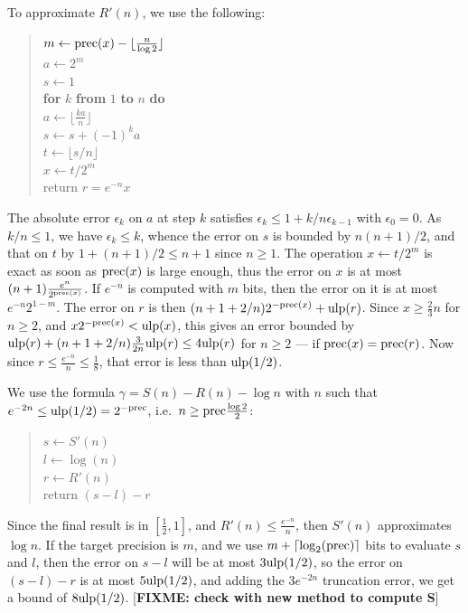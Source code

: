 \documentclass[12pt]{amsart}
\def\q{\hspace*{5mm}}
\def\ulp{{\rm ulp}}
\def\Paragraph#1{\noindent {\sc #1}}
\begin{document}
To approximate $R'(n)$, we use the following:
\begin{quote}
$m \leftarrow {\rm prec}(x) - \lfloor \frac{n}{\log 2} \rfloor$ \\
$a \leftarrow 2^m$ \\
$s \leftarrow 1$ \\
{\bf for} $k$ {\bf from} $1$ {\bf to} $n$ {\bf do} \\
\q $a \leftarrow \lfloor \frac{k a}{n} \rfloor$ \\
\q $s \leftarrow s + (-1)^{k} a$ \\
$t \leftarrow \lfloor s/n \rfloor$ \\
$x \leftarrow t/2^m$ \\
return $r = e^{-n} x$
\end{quote}
The absolute error $\epsilon_k$ on $a$ at step $k$ satisfies
$\epsilon_k \le 1 + k/n \epsilon_{k-1}$ with $\epsilon_0=0$.
As $k/n \le 1$, we have $\epsilon_k \le k$, whence the error
on $s$ is bounded by $n(n+1)/2$, and that on $t$ by
$1 + (n+1)/2 \le n+1$ since $n \ge 1$.
The operation $x \leftarrow t/2^m$ is exact as soon as ${\rm prec}(x)$ is large
enough, thus the error on $x$ is at most $(n+1) \frac{e^n}{2^{{\rm prec}(x)}}$.
If $e^{-n}$ is computed with $m$ bits, then
the error on it is at most $e^{-n} 2^{1-m}$.
The error on $r$ is then $(n + 1 + 2/n) 2^{-{\rm prec}(x)} +
\ulp(r)$.
Since $x \ge \frac{2}{3} n$ for $n \ge 2$, and $x 2^{-{\rm prec}(x)}
< \ulp(x)$, this gives an error bounded by
$\ulp(r) + (n + 1 + 2/n) \frac{3}{2n} \ulp(r)
\le 4 \ulp(r)$ for $n \ge 2$ --- if ${\rm prec}(x) = {\rm prec}(r)$.
Now since $r \le \frac{e^{-n}}{n} \le \frac{1}{8}$, that error
is less than $\ulp(1/2)$.

\medskip

\Paragraph{Final computation.} We use the formula
$\gamma = S(n) - R(n) - \log n$ with $n$ such that $e^{-2n} \le
\ulp(1/2) = 2^{-{\rm prec}}$, i.e.\ $n \ge {\rm prec} \frac{\log 2}{2}$:
\begin{quote}
$s \leftarrow S'(n)$ \\
$l \leftarrow \log(n)$ \\
$r \leftarrow R'(n)$ \\
return $(s - l) - r$
\end{quote}
Since the final result is in $[\frac{1}{2}, 1]$, and $R'(n) \le
\frac{e^{-n}}{n}$, then $S'(n)$ approximates $\log n$.
If the target precision is $m$, and
we use $m + \lceil \log_2({\rm prec}) \rceil$ bits to evaluate $s$ and $l$,
then the error on $s-l$ will be at most $3 \ulp(1/2)$,
so the error on $(s - l) - r$ is at most $5 \ulp(1/2)$,
and adding the $3 e^{-2n}$ truncation error, we get a bound of
$8 \ulp(1/2)$.
[\textbf{FIXME: check with new method to compute S}]
\end{document}
